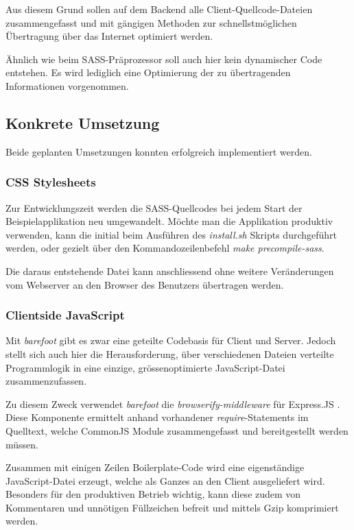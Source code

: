 Aus diesem Grund sollen auf dem Backend alle Client-Quellcode-Dateien zusammengefasst und mit gängigen Methoden zur schnellstmöglichen Übertragung über das Internet optimiert werden.

Ähnlich wie beim SASS-Präprozessor soll auch hier kein dynamischer Code entstehen. Es wird lediglich eine Optimierung der zu übertragenden Informationen vorgenommen.


\subsection*{Konkrete Umsetzung}
Beide geplanten Umsetzungen konnten erfolgreich implementiert werden.

\subsubsection*{CSS Stylesheets}
Zur Entwicklungszeit werden die SASS-Quellcodes bei jedem Start der Beispielapplikation neu umgewandelt. Möchte man die Applikation produktiv verwenden, kann die initial beim Ausführen des \emph{install.sh} Skripts durchgeführt werden, oder gezielt über den Kommandozeilenbefehl \emph{make precompile-sass}.

Die daraus entstehende Datei kann anschliessend ohne weitere Veränderungen vom Webserver an den Browser des Benutzers übertragen werden.

\subsubsection*{Clientside JavaScript}
Mit \emph{barefoot} \cite{Barefoot} gibt es zwar eine geteilte Codebasis für Client und Server. Jedoch stellt sich auch hier die Herausforderung, über verschiedenen Dateien verteilte Programmlogik in eine einzige, grössenoptimierte JavaScript-Datei zusammenzufassen.

Zu diesem Zweck verwendet \emph{barefoot} die \emph{browserify-middleware} für Express.JS \cite{browserifymiddleware}. Diese Komponente ermittelt anhand vorhandener \emph{require}-Statements im Quelltext, welche CommonJS Module \cite{commonjsmodules} zusammengefasst und bereitgestellt werden müssen.

Zusammen mit einigen Zeilen \gls{Boilerplate}-Code wird eine eigenständige JavaScript-Datei erzeugt, welche als Ganzes an den Client ausgeliefert wird. Besonders für den produktiven Betrieb wichtig, kann diese zudem von Kommentaren und unnötigen Füllzeichen befreit und mittels Gzip \cite{gzip} komprimiert werden.

